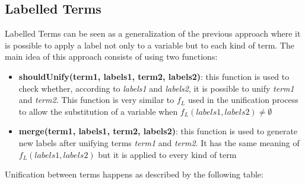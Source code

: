 \subsection{Labelled Terms}\label{subsec:labelled_terms}
Labelled Terms can be seen as a generalization of the previous approach where it is possible to apply a label not only to a variable
but to each kind of term. The main idea of this approach consists of using two functions:
\begin{itemize}
    \item \textbf{shouldUnify(term1, labels1, term2, labels2)}: this function is used to check whether, according to \textit{labels1} and \textit{labels2},
    it is possible to unify \textit{term1} and \textit{term2}. This function is very similar to $f_L$ used in
    the unification process to allow the substitution of a variable when $f_L(labels1,labels2) \neq \emptyset$
    \item \textbf{merge(term1, labels1, term2, labels2)}: this function is used to generate new labels after unifying terms \textit{term1} and \textit{term2}.
    It has the same meaning of $f_L(labels1,labels2)$ but it is applied to every kind of term
\end{itemize}
Unification between terms happens as described by the following table:

